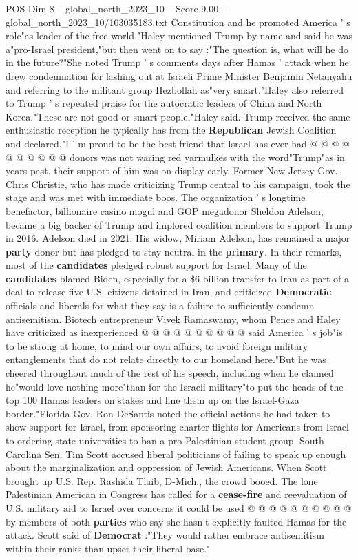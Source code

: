 \begin{textsample}{POS Dim 8 – global\_north\_2023\_10 – Score 9.00 – global\_north\_2023\_10/103035183.txt}
Constitution and he promoted America ' s role"as leader of the free world."Haley mentioned Trump by name and said he was a"pro-Israel president,"but then went on to say :"The question is, what will he do in the future?"She noted Trump ' s comments days after Hamas ' attack when he drew condemnation for lashing out at Israeli Prime Minister Benjamin Netanyahu and referring to the militant group Hezbollah as"very smart."Haley also referred to Trump ' s repeated praise for the autocratic leaders of China and North Korea."These are not good or smart people,"Haley said.
Trump received the same enthusiastic reception he typically has from the \textbf{Republican} Jewish Coalition and declared,"I ' m proud to be the best friend that Israel has ever had @ @ @ @ @ @ @ @ @ @ donors was not waring red yarmulkes with the word"Trump"as in years past, their support of him was on display early.
Former New Jersey Gov.
Chris Christie, who has made criticizing Trump central to his campaign, took the stage and was met with immediate boos.
The organization ' s longtime benefactor, billionaire casino mogul and GOP megadonor Sheldon Adelson, became a big backer of Trump and implored coalition members to support Trump in 2016.
Adelson died in 2021.
His widow, Miriam Adelson, has remained a major \textbf{party} donor but has pledged to stay neutral in the \textbf{primary}.
In their remarks, most of the \textbf{candidates} pledged robust support for Israel.
Many of the \textbf{candidates} blamed Biden, especially for a \$6 billion transfer to Iran as part of a deal to release five U.S. citizens detained in Iran, and criticized \textbf{Democratic} officials and liberals for what they say is a failure to sufficiently condemn antisemitism.
Biotech entrepreneur Vivek Ramaswamy, whom Pence and Haley have criticized as inexperienced @ @ @ @ @ @ @ @ @ @ said America ' s job"is to be strong at home, to mind our own affairs, to avoid foreign military entanglements that do not relate directly to our homeland here."But he was cheered throughout much of the rest of his speech, including when he claimed he"would love nothing more"than for the Israeli military"to put the heads of the top 100 Hamas leaders on stakes and line them up on the Israel-Gaza border."Florida Gov.
Ron DeSantis noted the official actions he had taken to show support for Israel, from sponsoring charter flights for Americans from Israel to ordering state universities to ban a pro-Palestinian student group.
South Carolina Sen.
Tim Scott accused liberal politicians of failing to speak up enough about the marginalization and oppression of Jewish Americans.
When Scott brought up U.S.
Rep.
Rashida Tlaib, D-Mich., the crowd booed.
The lone Palestinian American in Congress has called for a \textbf{cease-fire} and reevaluation of U.S. military aid to Israel over concerns it could be used @ @ @ @ @ @ @ @ @ @ by members of both \textbf{parties} who say she hasn't explicitly faulted Hamas for the attack.
Scott said of \textbf{Democrat} :"They would rather embrace antisemitism within their ranks than upset their liberal base."

\end{textsample}
